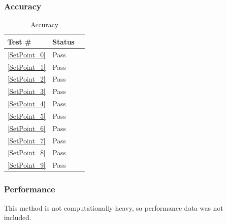 \documentclass[12pt]{article}
\newcounter{TestCounter}
\begin{document}
	\subsubsection{Accuracy}
		\begin{table}[H]
		\centering
		\caption{Accuracy}\label{SetPoint_acc}
		\begin{tabular}{lll}
		\toprule
		\bf Test \# & Status \\\midrule
		\ref{SetPoint_0} & Pass\\
		\ref{SetPoint_1} & Pass\\
		\ref{SetPoint_2} & Pass\\
		\ref{SetPoint_3} & Pass\\
		\ref{SetPoint_4} & Pass\\
		\ref{SetPoint_5} & Pass\\
		\ref{SetPoint_6} & Pass\\
		\ref{SetPoint_7} & Pass\\
		\ref{SetPoint_8} & Pass\\
		\ref{SetPoint_9} & Pass\\
		\bottomrule
		\end{tabular}
		\end{table}
	\subsubsection{Performance}
		This method is not computationally heavy, so performance data was not included.

\end{document}
